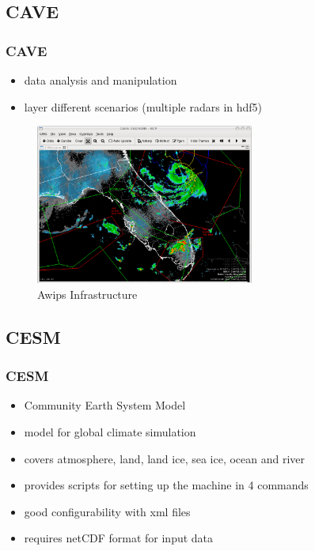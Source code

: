 \documentclass[compress]{beamer}
\begin{document}
\subsection{CAVE}
\begin{frame}
    \frametitle{CAVE}

    \begin{itemize}
        \item data analysis and manipulation \cite{AwipsDocs}
        \item layer different scenarios (multiple radars in hdf5)
	\end{itemize}

    \begin{center}
    	\begin{figure}
			\includegraphics[width=0.64\textwidth]{gfx/Unidata_AWIPS2_CAVE.png}
      	  	\caption[]{Awips Infrastructure \cite{Uni01}}
		\end{figure}
	\end{center}
\end{frame}


\subsection{CESM}
\begin{frame}
    \frametitle{CESM}
    	\begin{itemize}
    	    \item Community Earth System Model
			\item model for global climate simulation
			\item covers atmosphere, land, land ice, sea ice, ocean and river
			\item provides scripts for setting up the machine in 4 commands
		    \item good configurability with xml files
		    \item requires netCDF format for input data \cite{CESMDocs}
		\end{itemize}
\end{frame}
\end{document}
